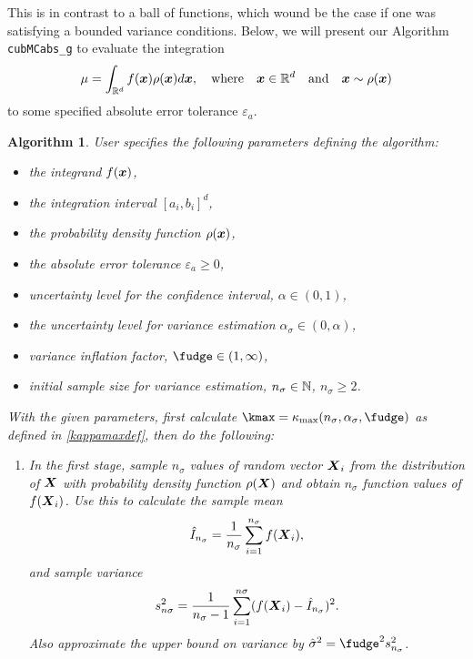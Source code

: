 \documentclass{iitthesis}
\newtheorem{algorithm}[theorem]{Algorithm}
\begin{document}
This is in contrast to a ball of functions, which wound be the case if one was satisfying a bounded variance conditions.
Below, we will present our Algorithm {\tt cubMCabs\_g} to evaluate the integration
$$\mu = \int_{\mathbb{R}^d} f(\boldsymbol{x})\rho(\boldsymbol{x})d\boldsymbol{x}, \quad \text{where}\quad \boldsymbol{x} \in \mathbb{R}^d \quad \text{and}\quad  \boldsymbol{x} \sim \rho(\boldsymbol{x})$$
to some specified absolute error tolerance $\varepsilon_a$.
\begin{algorithm}\label{alg:cubMCabsg} 
User specifies the following parameters defining the algorithm:
\begin{itemize}
\item the integrand $f(\boldsymbol{x})$,
\item the integration interval $[a_i,b_i]^d$,
\item the probability density function $\rho(\boldsymbol{x})$,
\item the absolute error tolerance $\varepsilon_a \geq 0$,
\item uncertainty level for the confidence interval, $\alpha\in (0,1)$,
\item the uncertainty level for variance estimation $\alpha_\sigma \in (0,\alpha)$,
\item variance inflation factor, $\fudge \in (1,\infty)$, 
\item initial sample size for variance estimation, $n_{\sigma} \in \mathbb{N}$, $n_{\sigma} \geq 2$.
\end{itemize} 
With the given parameters, first calculate $\kmax=\kappa_{\max}(n_\sigma,\alpha_\sigma,\fudge)$ as defined in \eqref{kappamaxdef}, then do the following:
\begin{enumerate}
\item In the first stage, sample $n_\sigma$ values of random vector $\boldsymbol{X}_i$ from the distribution of $\boldsymbol{X}$ with probability density function $\rho(\boldsymbol{X})$ and obtain $n_\sigma$ function values of $f(\boldsymbol{X}_i)$. Use this to calculate the sample mean $$\hat{I}_{n_\sigma} = \frac{1}{n_\sigma}\sum_{i=1}^{n_\sigma} f(\boldsymbol{X}_i),$$ and sample variance $$s_{n\sigma}^2 = \frac{1}{n_\sigma-1}\sum_{i=1}^{n\sigma} (f(\boldsymbol{X}_i)-\hat{I}_{n_\sigma})^2.$$ Also approximate the upper bound on variance by $\hsigma^2 = \fudge^2 s^2_{n_\sigma}$. 


\end{enumerate}
\end{algorithm}
\end{document}
